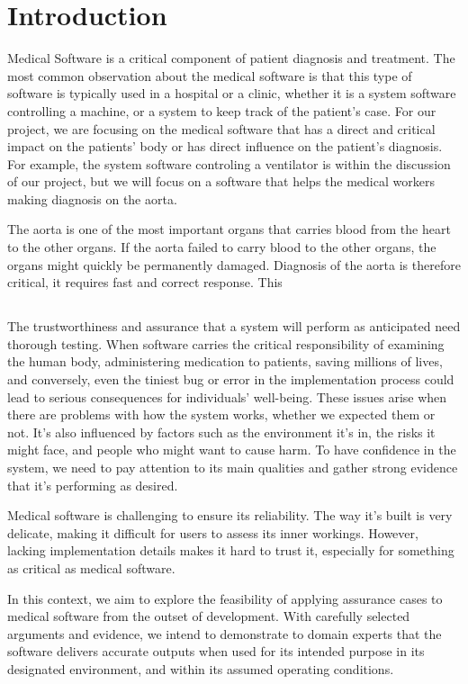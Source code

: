 \chapter{Introduction} \label{intro}

Medical Software is a critical component of patient diagnosis and treatment. The most common observation about the medical software is that this type of software is typically used in a hospital or a clinic, whether it is a system software controlling a machine, or a system to keep track of the patient's case. For our project, we are focusing on the medical software that has a direct and critical impact on the patients' body or has direct influence on the patient's diagnosis. For example, the system software controling a ventilator is within the discussion of our project, but we will focus on a software that helps the medical workers making diagnosis on the aorta. 

The aorta is one of the most important organs that carries blood from the heart to the other organs. If the aorta failed to carry blood to the other organs, the organs might quickly be permanently damaged. Diagnosis of the aorta is therefore critical, it requires fast and correct response. This 

\section{}
The trustworthiness and assurance that a system will perform as anticipated need thorough testing. When software carries the critical responsibility of examining the human body, administering medication to patients, saving millions of lives, and conversely, even the tiniest bug or error in the implementation process could lead to serious consequences for individuals' well-being. These issues arise when there are problems with how the system works, whether we expected them or not. It's also influenced by factors such as the environment it's in, the risks it might face, and people who might want to cause harm. To have confidence in the system, we need to pay attention to its main qualities and gather strong evidence that it's performing as desired.

Medical software is challenging to ensure its reliability. The way it's built is very delicate, making it difficult for users to assess its inner workings. However, lacking implementation details makes it hard to trust it, especially for something as critical as medical software.

In this context, we aim to explore the feasibility of applying assurance cases to medical software from the outset of development. With carefully selected arguments and evidence, we intend to demonstrate to domain experts that the software delivers accurate outputs when used for its intended purpose in its designated environment, and within its assumed operating conditions.

